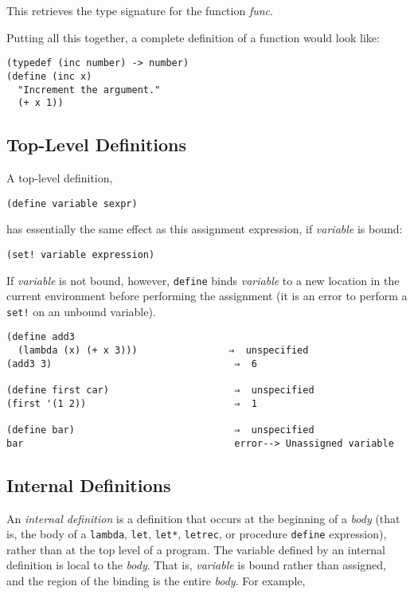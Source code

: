 \documentclass{article}
\begin{document}
This retrieves the type signature for the function \emph{func}.


Putting all this together, a complete definition of a function would look like:

\begin{verbatim}
(typedef (inc number) -> number)
(define (inc x) 
  "Increment the argument." 
  (+ x 1))
\end{verbatim}

\subsection{Top-Level Definitions}\label{sec:top-level-definitions}

A top-level definition,

\begin{verbatim}
(define variable sexpr)
\end{verbatim}

has essentially the same effect as this assignment expression, if \emph{variable} is bound:

\begin{verbatim}
(set! variable expression)
\end{verbatim}

If \emph{variable} is not bound, however, \verb|define| binds \emph{variable} to a new
location in the current environment before performing the assignment (it is an error to
perform a \verb|set!| on an unbound variable).

\begin{verbatim}
(define add3
  (lambda (x) (+ x 3)))                ⇒  unspecified
(add3 3)                                ⇒  6

(define first car)                      ⇒  unspecified
(first '(1 2))                          ⇒  1

(define bar)                            ⇒  unspecified
bar                                     error--> Unassigned variable
\end{verbatim}

\subsection{Internal Definitions}\label{sec:internal-definitions}

An \emph{internal definition} is a definition that occurs at the beginning of a \emph{body}
(that is, the body of a \verb|lambda|, \verb|let|, \verb|let*|, \verb|letrec|, or
procedure \verb|define| expression), rather than at the top level of a program. The
variable defined by an internal definition is local to the \emph{body}. That is,
\emph{variable} is bound rather than assigned, and the region of the binding is the entire
\emph{body}. For example,
\end{document}
